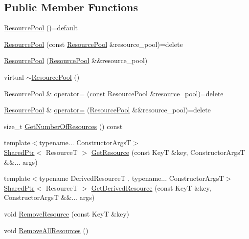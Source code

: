 \subsection*{Public Member Functions}
\begin{DoxyCompactItemize}
\item 
\hyperlink{classmage_1_1_resource_pool_a94aff142869744ed48fb1b426face48b}{Resource\+Pool} ()=default
\item 
\hyperlink{classmage_1_1_resource_pool_a82253c9c4adfc120a813dfe811dd5e91}{Resource\+Pool} (const \hyperlink{classmage_1_1_resource_pool}{Resource\+Pool} \&resource\+\_\+pool)=delete
\item 
\hyperlink{classmage_1_1_resource_pool_adf8c262e3fb0c01c8efb9650bf05951b}{Resource\+Pool} (\hyperlink{classmage_1_1_resource_pool}{Resource\+Pool} \&\&resource\+\_\+pool)
\item 
virtual \hyperlink{classmage_1_1_resource_pool_ae4fff3d951818d417f77965c2db265f6}{$\sim$\+Resource\+Pool} ()
\item 
\hyperlink{classmage_1_1_resource_pool}{Resource\+Pool} \& \hyperlink{classmage_1_1_resource_pool_ae8121e031efe9f98605e478b01b19d33}{operator=} (const \hyperlink{classmage_1_1_resource_pool}{Resource\+Pool} \&resource\+\_\+pool)=delete
\item 
\hyperlink{classmage_1_1_resource_pool}{Resource\+Pool} \& \hyperlink{classmage_1_1_resource_pool_a1c0c196460508108435c227c11a65b94}{operator=} (\hyperlink{classmage_1_1_resource_pool}{Resource\+Pool} \&\&resource\+\_\+pool)=delete
\item 
size\+\_\+t \hyperlink{classmage_1_1_resource_pool_ae2f9964a1821c9b8cb38303a5a88c98e}{Get\+Number\+Of\+Resources} () const
\item 
{\footnotesize template$<$typename... Constructor\+ArgsT$>$ }\\\hyperlink{namespacemage_a1e01ae66713838a7a67d30e44c67703e}{Shared\+Ptr}$<$ ResourceT $>$ \hyperlink{classmage_1_1_resource_pool_a66629c973e3a9390b611bf3d0264e9d3}{Get\+Resource} (const KeyT \&key, Constructor\+ArgsT \&\&... args)
\item 
{\footnotesize template$<$typename Derived\+ResourceT , typename... Constructor\+ArgsT$>$ }\\\hyperlink{namespacemage_a1e01ae66713838a7a67d30e44c67703e}{Shared\+Ptr}$<$ ResourceT $>$ \hyperlink{classmage_1_1_resource_pool_a620f6e701702ace07578a5facfe86d66}{Get\+Derived\+Resource} (const KeyT \&key, Constructor\+ArgsT \&\&... args)
\item 
void \hyperlink{classmage_1_1_resource_pool_a56680a516f219bcf69bf5c8aaebdfeed}{Remove\+Resource} (const KeyT \&key)
\item 
void \hyperlink{classmage_1_1_resource_pool_a83a33e15bd8f326d0ebc11b3f8e52a41}{Remove\+All\+Resources} ()
\end{DoxyCompactItemize}
